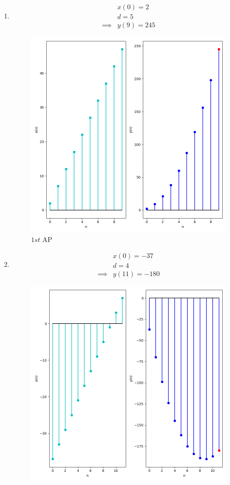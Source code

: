 \documentclass[journal,12pt,twocolumn]{IEEEtran}
\theoremstyle{remark}
\begin{document}
\begin{enumerate}[label=(\alph*)]
    \item \begin{align}
        &x(0)=2 \\
        &d=5 \\
        \implies &y(9)=245
    \end{align}
    \begin{figure}[h!]
        \centering
        \includegraphics[width=0.9\columnwidth]{figs/plt1.png}
        \caption{$1st$ AP}
    \end{figure}
    \item \begin{align}
        &x(0)=-37 \\
        &d=4 \\
        \implies &y(11)=-180
    \end{align}
    \begin{figure}[h!]
        \centering
        \includegraphics[width=0.9\columnwidth]{figs/plt2.png}

\end{figure}
\end{enumerate}
\end{document}
